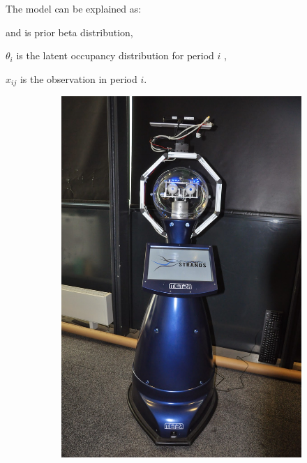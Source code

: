 The model can be explained as:

	\boldmath{$\alpha$} and \boldmath{$\beta$} is  prior beta distribution, 
	
	$\theta_i$ is the latent occupancy distribution for period $i$  ,
	
	$x_{ij}$ is the observation in period $i$.


\begin{figure}
    \centering
    \begin{subfigure}[b]{0.21\textwidth}
        \includegraphics[width=\textwidth]{images/scitos.jpg}
        \caption{}
        \label{fig:scitos-1}
    \end{subfigure}
    ~ %

\end{figure}
